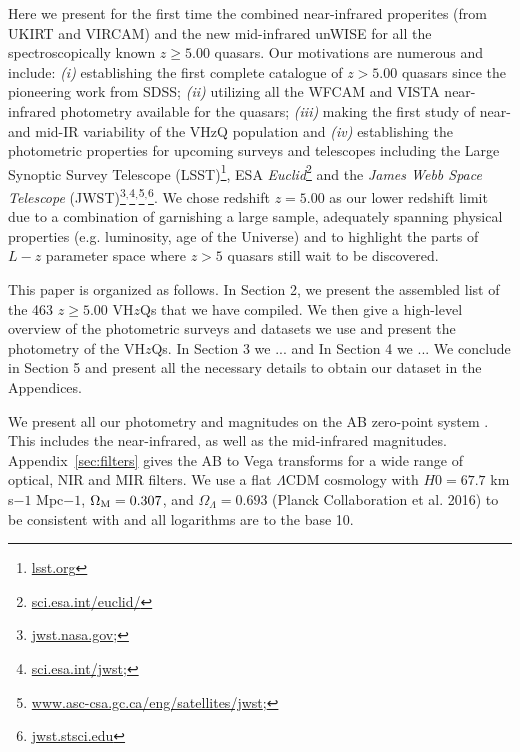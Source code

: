 \documentclass[usenatbib]{mnras}
\begin{document}
Here we present for the first time the combined near-infrared properites (from UKIRT and VIRCAM) and the new mid-infrared unWISE for all the spectroscopically known $z\geq5.00$ quasars. Our motivations are numerous and include: {\it (i)} establishing the first complete catalogue of $z>5.00$ quasars since the pioneering work from SDSS; {\it (ii)} utilizing all the WFCAM and VISTA near-infrared photometry available for the quasars; {\it (iii)} making the first study of near- and mid-IR variability of the VHzQ population and {\it (iv)} establishing the photometric properties for upcoming surveys and telescopes including the Large Synoptic Survey Telescope (LSST)\footnote{\href{https://www.lsst.org}{{lsst.org}}}, ESA {\it Euclid}\footnote{\href{https://sci.esa.int/euclid/}{sci.esa.int/euclid/}} and the {\it James Webb Space Telescope} (JWST)\footnote{\href{https://www.jwst.nasa.gov/}{jwst.nasa.gov};}$^,$\footnote{\href{https://sci.esa.int/jwst/}{sci.esa.int/jwst};}$^,$\footnote{\href{https://www.asc-csa.gc.ca/eng/satellites/jwst/}{www.asc-csa.gc.ca/eng/satellites/jwst};}$^,$\footnote{\href{https://jwst.stsci.edu/}{jwst.stsci.edu}}. We chose redshift $z=5.00$ as our lower redshift limit due to a combination of garnishing a large sample, adequately spanning physical properties (e.g. luminosity, age of the Universe) and to highlight the parts of $L-z$ parameter space where $z>5$ quasars still wait to be discovered. 

This paper is organized as follows.  In Section 2, we present the assembled list of the 463 $z\geq5.00$ VH$z$Qs that we have compiled. We then give a high-level overview of the photometric surveys and datasets we use and present the photometry of the VH$z$Qs. In Section 3 we ... and In Section 4 we ... We conclude in Section 5 and present all the necessary details to obtain our dataset in the Appendices. 

We present all our photometry and magnitudes on the AB zero-point system \citep{Oke_Gunn1983, Fukugita1996}.  This includes the near-infrared, as well as the mid-infrared magnitudes. Appendix~\ref{sec:filters} gives the AB to Vega transforms for a wide range of optical, NIR and MIR filters. We use a flat $\Lambda$CDM cosmology with $H0 = 67.7$ km s$-1$ Mpc$−1$, $\Omega_{\rm M} = 0.307$, and $\Omega_{\Lambda} = 0.693$ (Planck Collaboration et al. 2016) to be consistent with \citet{Banados2016} and all logarithms are to the base 10. 
\end{document}
